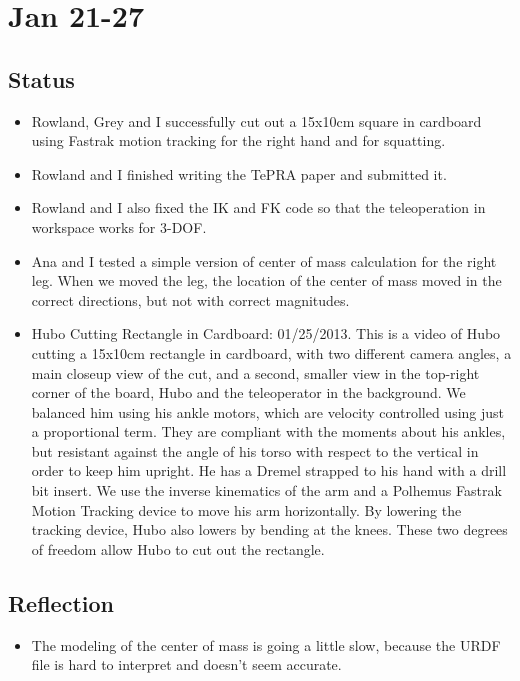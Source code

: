 \documentclass[letterpaper, 10 pt]{report}
\begin{document}
\section*{Jan 21-27}
\subsection*{Status}
\begin{itemize}
\item Rowland, Grey and I successfully cut out a 15x10cm square in
cardboard using Fastrak motion tracking for the right hand and for squatting.
\item Rowland and I finished writing the TePRA paper and submitted it.
\item Rowland and I also fixed the IK and FK code so that the teleoperation in
workspace works for 3-DOF.
\item Ana and I tested a simple version of center of mass calculation for the right
leg. When we moved the leg, the location of the center of mass moved in the
correct directions, but not with correct magnitudes. 
\item Hubo Cutting Rectangle in Cardboard: 01/25/2013. This is a video of Hubo cutting
a 15x10cm rectangle in cardboard, with two different camera angles, a main
closeup view of the cut, and a second, smaller view in the top-right corner of
the board, Hubo and the teleoperator in the background. We balanced him using
his ankle motors, which are velocity controlled using just a proportional term.
They are compliant with the moments about his ankles, but resistant against the
angle of his torso with respect to the vertical in order to keep him upright. He
has a Dremel strapped to his hand with a drill bit insert. We use the inverse
kinematics of the arm and a Polhemus Fastrak Motion Tracking device to move his
arm horizontally. By lowering the tracking device, Hubo also lowers by bending
at the knees. These two degrees of freedom allow Hubo to cut out the rectangle.
\end{itemize}

\subsection*{Reflection}
\begin{itemize}
\item The modeling of the center of mass is going a little slow, because the
URDF file is hard to interpret and doesn't seem accurate.
\end{itemize}
\end{document}
